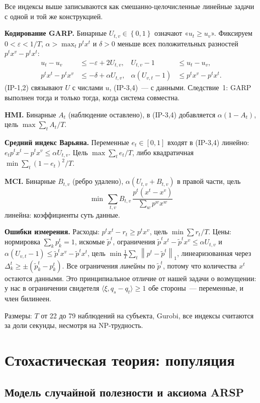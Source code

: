 \documentclass[a4paper,11pt]{article}
\theoremstyle{plain}
\theoremstyle{definition}
\theoremstyle{remark}
\newcommand{\norm}[1]{\left\lVert #1 \right\rVert}
\newcommand{\set}[1]{\left\{ #1 \right\}}
\newcommand{\ip}[2]{\langle #1, #2\rangle} %
\begin{document}
Все индексы выше записываются как смешанно-целочисленные линейные задачи с одной и той же конструкцией.

\textbf{Кодирование GARP.} Бинарные $U_{t,v}\in\set{0,1}$ означают «$u_t\ge u_v$». Фиксируем $0<\varepsilon<1/T$, $\alpha>\max_tp^tx^t$ и $\delta>0$ меньше всех положительных разностей $p^tx^v-p^tx^t$:
\begin{align*}
    u_t-u_v&\le-\varepsilon+2U_{t,v}, & U_{t,v}-1&\le u_t-u_v, \tag{IP-1,2}\\
    p^tx^t-p^tx^v&\le-\delta+\alpha U_{t,v}, & \alpha(U_{v,t}-1)&\le p^tx^v-p^tx^t. \tag{IP-3,4}
\end{align*}
(IP-1,2) связывают $U$ с числами $u$, (IP-3,4)~--- с данными. Следствие~1: GARP выполнен тогда и только тогда, когда система совместна.

\textbf{HMI.} Бинарные $A_t$ (наблюдение оставлено), в (IP-3,4) добавляется $\alpha(1-A_t)$, цель $\max\sum_tA_t/T$.

\textbf{Средний индекс Варьяна.} Переменные $e_t\in[0,1]$ входят в (IP-3,4) линейно: $e_tp^tx^t-p^tx^v\le\alpha U_{t,v}$. Цель $\max\sum_te_t/T$, либо квадратичная $\min\sum_t(1-e_t)^2/T$.

\textbf{MCI.} Бинарные $B_{t,v}$ (ребро удалено), $\alpha(U_{t,v}+B_{t,v})$ в правой части, цель
\[
    \min\ \sum_{t,v}B_{t,v}\,\frac{p^t(x^t-x^v)}{\sum_wp^wx^w}
\]
линейна: коэффициенты суть данные.

\textbf{Ошибки измерения.} Расходы: $p^tx^t-r_t\ge p^tx^v$, цель $\min\sum r_t/T$. Цены: нормировка $\sum_kp^t_k=1$, искомые $\tilde p^t$, ограничения $\tilde p^tx^t-\tilde p^tx^v\le\alpha U_{t,v}$ и $\alpha(U_{v,t}-1)\le\tilde p^tx^v-\tilde p^tx^t$, цель $\min\frac1T\sum_t\norm{p^t-\tilde p^t}_1$, линеаризованная через $\Delta^t_k\ge\pm(\tilde p^t_k-p^t_k)$. Все ограничения \emph{линейны} по $\tilde p^t$, потому что количества $x^t$ остаются данными. Это принципиальное отличие от нашей задачи о возмущении: у нас в ограничении свидетеля $\ip{\xi}{q_s-q_t}\ge1$ обе стороны~--- переменные, и член билинеен.

Размеры: $T$ от 22 до 79 наблюдений на субъекта, Gurobi, все индексы считаются за доли секунды, несмотря на NP-трудность.

\section{Стохастическая теория: популяция}

\subsection{Модель случайной полезности и аксиома ARSP}
\end{document}
